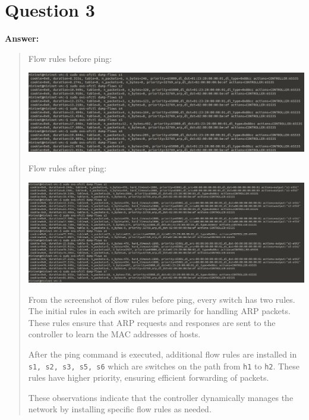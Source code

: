 \documentclass{article}
\begin{document}
\section*{Question 3}
\textbf{Answer:}
\begin{quote}
    Flow rules before ping:
    \begin{center}
        \includegraphics[scale=0.44]{screenshot/dump-flow-before.png}
    \end{center}
    Flow rules after ping:
    \begin{center}
        \includegraphics[scale=0.375]{screenshot/dump-flow-after.png}
    \end{center}

    From the screenshot of flow rules before ping, every switch has two rules. The initial rules in each switch are primarily for handling ARP packets. These rules ensure that ARP requests and responses are sent to the controller to learn the MAC addresses of hosts.

    After the ping command is executed, additional flow rules are installed in \texttt{s1, s2, s3, s5, s6} which are switches on the path from \texttt{h1} to \texttt{h2}. These rules have higher priority, ensuring efficient forwarding of packets.

    These observations indicate that the controller dynamically manages the network by installing specific flow rules as needed.
\end{quote}
\end{document}

